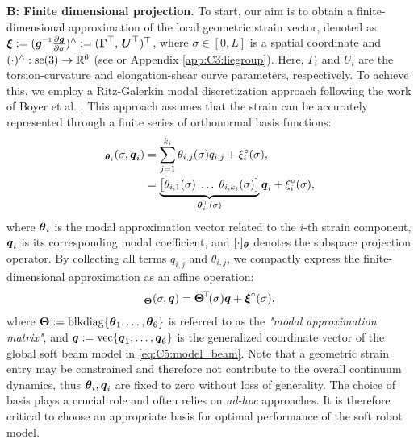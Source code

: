 \textbf{B: Finite dimensional projection.} To start, our aim is to obtain a finite-dimensional approximation of the local geometric strain vector, denoted as $\xiB:= (\gB\inv \tfrac{\p \gB}{\p \sigma})^\wedge := (\GammaB^\top,\,\UB^\top)^\top$, where $\sigma \in [0,L]$ is a spatial coordinate and $(\cdot)^{\wedge}: \textrm{se}(3) \to \mathbb{R}^6$ (see \cite{Murray1994} or Appendix \ref{app:C3:liegroup}). Here, $\Gamma_{i}$ and $U_{i}$ are the torsion-curvature and elongation-shear curve parameters, respectively. To achieve this, we employ a Ritz-Galerkin modal discretization approach following the work of Boyer et al. \cite{Boyer2021}. This approach assumes that the strain can be accurately represented through a finite series of orthonormal basis functions:
%
\begin{align}
[\xi_i]_{\thetaB_i}(\sigma,\q_i) & = \sum_{j=1}^{k_i} \theta_{i,j}(\sigma) q_{i,j} + \xi_i^\circ (\sigma), \notag \\ & = \underbrace{\big[\theta_{i,1}(\sigma)\; \hdots\; \theta_{i,k_i} (\sigma) \big]}_{\thetaB_i^\top(\sigma)} \q_i + \xi_i^\circ(\sigma),
\end{align}
%
where ${\boldsymbol{\theta}}_i$ is the modal approximation vector related to the $i$-th strain component, ${\boldsymbol{q}}_i$ is its corresponding modal coefficient, and $[\cdot]_{{\boldsymbol{\theta}}}$ denotes the subspace projection operator. By collecting all terms $q_{i,j}$ and $\theta_{i,j}$, we compactly express the finite-dimensional approximation as an affine operation:
%
\begin{equation}
[\xiB]_{\ThetaB}(\sigma,\q) = \ThetaB^{\!\top}\!(\sigma) \q + \xiB^{\circ}(\sigma),
\label{eq:C5:xi_computation_POD}
\end{equation}
%
where ${\boldsymbol{\Theta}}:= \textrm{blkdiag}\{{\boldsymbol{\theta}}_1,\dots,{\boldsymbol{\theta}}_6\}$ is referred to as the \textit{"modal approximation matrix"}, and ${\boldsymbol{q}}:=\textrm{vec}\{{\boldsymbol{q}}_1,\dots,{\boldsymbol{q}}_6\}$ is the generalized coordinate vector of the global soft beam model in \eqref{eq:C5:model_beam}. Note that a geometric strain entry may be constrained and therefore not contribute to the overall continuum dynamics, thus ${\boldsymbol{\theta}}_i,{\boldsymbol{q}}_i$ are fixed to zero without loss of generality. The choice of basis plays a crucial role and often relies on \textit{ad-hoc} approaches. It is therefore critical to choose an appropriate basis for optimal performance of the soft robot model. \\
% 

